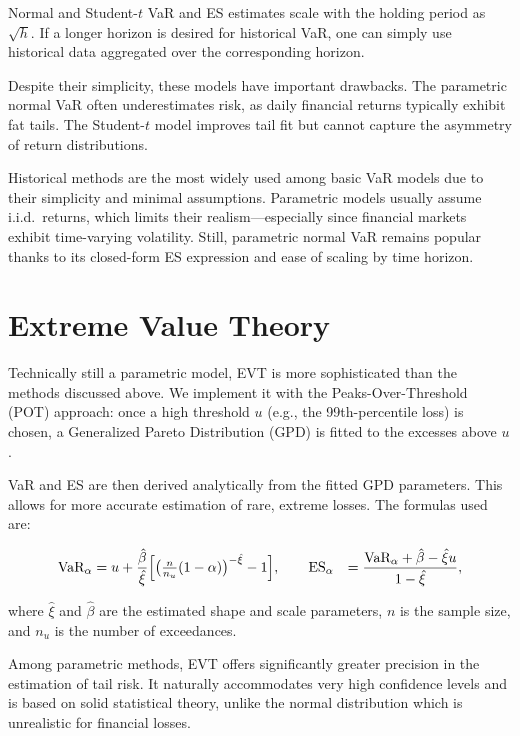 \documentclass[12pt]{article}
\begin{document}
Normal and Student-$t$ VaR and ES estimates scale with the holding period as $\sqrt{h}$. If a longer horizon is desired for historical VaR, one can simply use historical data aggregated over the corresponding horizon.

Despite their simplicity, these models have important drawbacks. The parametric normal VaR often underestimates risk, as daily financial returns typically exhibit fat tails. The Student-$t$ model improves tail fit but cannot capture the asymmetry of return distributions. 

Historical methods are the most widely used among basic VaR models due to their simplicity and minimal assumptions. Parametric models usually assume i.i.d.\ returns, which limits their realism—especially since financial markets exhibit time-varying volatility. Still, parametric normal VaR remains popular thanks to its closed-form ES expression and ease of scaling by time horizon.



\section{Extreme Value Theory}

Technically still a parametric model, EVT is more sophisticated than the methods discussed above. We implement it with the Peaks-Over-Threshold (POT) approach: once a high threshold $u$ (e.g., the 99th-percentile loss) is chosen, a Generalized Pareto Distribution (GPD) is fitted to the excesses above $u$. 

VaR and ES are then derived analytically from the fitted GPD parameters. This allows for more accurate estimation of rare, extreme losses. The formulas used are:

\[
\begin{aligned}
{\text{VaR}}_\alpha &= u + \frac{\hat{\beta}}{\hat{\xi}}
\Bigl[\bigl(\tfrac{n}{n_u}(1-\alpha)\bigr)^{-\hat{\xi}} - 1\Bigr],\qquad
{\text{ES}}_\alpha &= \frac{{\text{VaR}}_\alpha + \hat{\beta} - \hat{\xi} u}{1 - \hat{\xi}},
\end{aligned}
\]

where $\hat{\xi}$ and $\hat{\beta}$ are the estimated shape and scale parameters, $n$ is the sample size, and $n_u$ is the number of exceedances.

Among parametric methods, EVT offers significantly greater precision in the estimation of tail risk. It naturally accommodates very high confidence levels and is based on solid statistical theory, unlike the normal distribution which is unrealistic for financial losses.
\end{document}
